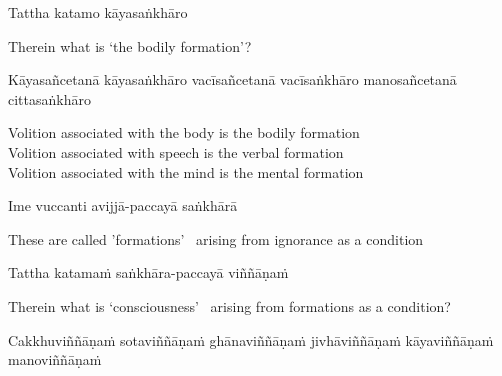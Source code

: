 Tattha katamo kāyasaṅkhāro

\begin{english}
  Therein what is `the bodily formation'?
\end{english}

\begin{pali-hang}
  Kāyasañcetanā kāyasaṅkhāro vacīsañcetanā vacīsaṅkhāro manosañcetanā cittasaṅkhāro\makeatletter\hyperlink{endnote78-appendix}\makeatother
\end{pali-hang}

\begin{english-verses}
  Volition associated with the body is the bodily formation\\
  Volition associated with speech is the verbal formation\\
  Volition associated with the mind is the mental\makeatletter\hyperlink{endnote79-appendix}\makeatother
  formation
\end{english-verses}

Ime vuccanti avijjā-paccayā saṅkhārā

\begin{english}
  These are called 'formations' \breathmark\ arising from ignorance as a condition
\end{english}

Tattha katamaṁ saṅkhāra-paccayā viññāṇaṁ

\begin{english-hang}
  Therein what is `consciousness' \breathmark\ arising from formations as a condition?
\end{english-hang}

\begin{pali-hang}
  Cakkhuviññāṇaṁ sotaviññāṇaṁ ghānaviññāṇaṁ jivhāviññāṇaṁ kāyaviññāṇaṁ manoviññāṇaṁ
\end{pali-hang}

